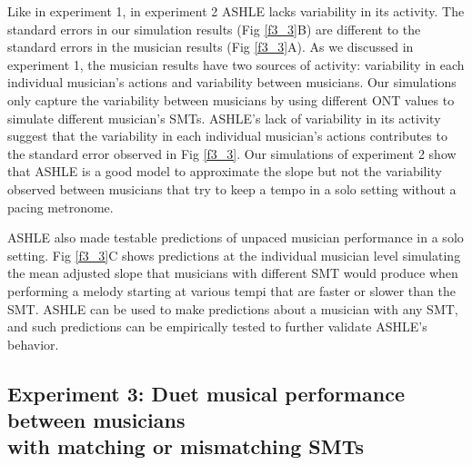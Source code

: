 \documentclass{report}
\begin{document}
Like in experiment 1, in experiment 2 ASHLE lacks variability in its activity. The standard errors in our simulation results (Fig \ref{f3_3}B) are different to the standard errors in the musician results (Fig \ref{f3_3}A). As we discussed in experiment 1, the musician results have two sources of activity: variability in each individual musician's actions and variability between musicians. Our simulations only capture the variability between musicians by using different ONT values to simulate different musician's SMTs. ASHLE's lack of variability in its activity suggest that the variability in each individual musician's actions contributes to the standard error observed in Fig \ref{f3_3}. Our simulations of experiment 2 show that ASHLE is a good model to approximate the slope but not the variability observed between musicians that try to keep a tempo in a solo setting without a pacing metronome.

ASHLE also made testable predictions of unpaced musician performance in a solo setting. Fig \ref{f3_3}C shows predictions at the individual musician level simulating the mean adjusted slope that musicians with different SMT would produce when performing a melody starting at various tempi that are faster or slower than the SMT. ASHLE can be used to make predictions about a musician with any SMT, and such predictions can be empirically tested to further validate ASHLE's behavior.

\subsection{Experiment 3: Duet musical performance between musicians \\ with matching or mismatching SMTs}
\end{document}
